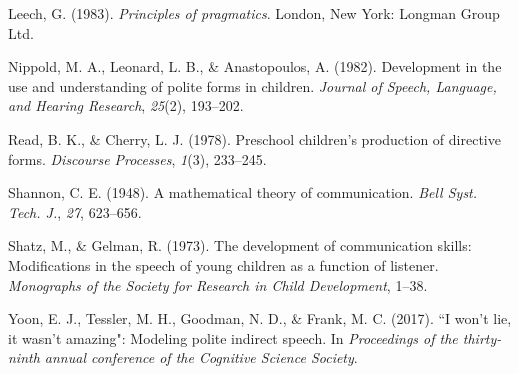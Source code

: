 \documentclass[10pt, letterpaper]{article}
\begin{document}
\hypertarget{ref-leech1983}{}
Leech, G. (1983). \emph{Principles of pragmatics}. London, New York:
Longman Group Ltd.

\hypertarget{ref-nippold1982}{}
Nippold, M. A., Leonard, L. B., \& Anastopoulos, A. (1982). Development
in the use and understanding of polite forms in children. \emph{Journal
of Speech, Language, and Hearing Research}, \emph{25}(2), 193--202.

\hypertarget{ref-read1978}{}
Read, B. K., \& Cherry, L. J. (1978). Preschool children's production of
directive forms. \emph{Discourse Processes}, \emph{1}(3), 233--245.

\hypertarget{ref-shannon1948}{}
Shannon, C. E. (1948). A mathematical theory of communication.
\emph{Bell Syst. Tech. J.}, \emph{27}, 623--656.

\hypertarget{ref-shatz1973}{}
Shatz, M., \& Gelman, R. (1973). The development of communication
skills: Modifications in the speech of young children as a function of
listener. \emph{Monographs of the Society for Research in Child
Development}, 1--38.

\hypertarget{ref-yoon2017}{}
Yoon, E. J., Tessler, M. H., Goodman, N. D., \& Frank, M. C. (2017). ``I
won't lie, it wasn't amazing": Modeling polite indirect speech. In
\emph{Proceedings of the thirty-ninth annual conference of the Cognitive
Science Society}.


\end{document}
